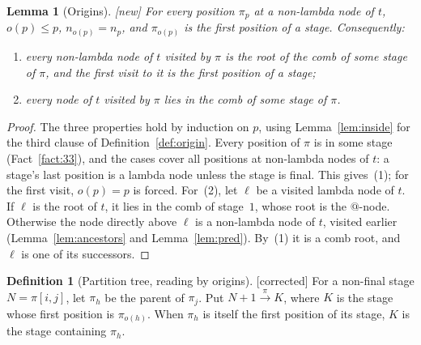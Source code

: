 \documentclass[11pt]{article}
\newcommand{\iv}[2]{\pi[#1,#2]}
\newcommand{\ra}[1]{\xrightarrow{#1}}
\newcommand{\Fixed}{\textsf{[corrected]}}
\newcommand{\New}{\textsf{[new]}}
\theoremstyle{plain}
\newtheorem{lemma}[theorem]{Lemma}
\theoremstyle{definition}
\newtheorem{definition}[theorem]{Definition}
\theoremstyle{remark}
\begin{document}
\begin{lemma}[Origins]\label{lem:origin}
\New{} For every position $\pi_p$ at a non-lambda node of $t$,
$o(p)\le p$, $n_{o(p)}=n_p$, and $\pi_{o(p)}$ is the first position of a
stage.  Consequently:
\begin{enumerate}
\item every non-lambda node of $t$ visited by $\pi$ is the root of the
  comb of some stage of $\pi$, and the first visit to it is the first
  position of a stage;
\item every node of $t$ visited by $\pi$ lies in the comb of some stage
  of $\pi$.
\end{enumerate}
\end{lemma}
\begin{proof}
The three properties hold by induction on $p$, using
Lemma~\ref{lem:inside} for the third clause of
Definition~\ref{def:origin}.  Every position of $\pi$ is in some stage
(Fact~\ref{fact:33}), and the cases cover all positions at non-lambda
nodes of $t$: a stage's last position is a lambda node unless the stage
is final.  This gives~(1); for the first visit, $o(p)=p$ is forced.
For~(2), let $\ell$ be a visited lambda node of $t$.  If $\ell$ is the
root of $t$, it lies in the comb of stage~$1$, whose root is the
$@$-node.  Otherwise the node directly above $\ell$ is a non-lambda node
of $t$, visited earlier (Lemma~\ref{lem:ancestors} and
Lemma~\ref{lem:pred}).  By~(1) it is a comb root, and $\ell$ is one of
its successors.
\end{proof}

\begin{definition}[Partition tree, reading by origins]\label{def:ptree2}
\Fixed{} For a non-final stage $N=\iv ij$, let $\pi_h$ be the parent of
$\pi_j$.  Put $N+1\ra\pi K$, where $K$ is the stage whose first
position is $\pi_{o(h)}$.  When $\pi_h$ is itself the first position of
its stage, $K$ is the stage containing $\pi_h$.
\end{definition}
\end{document}
